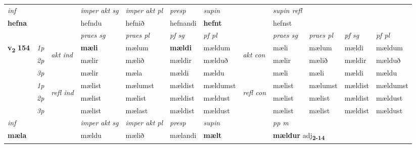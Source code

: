 \begin{longtable}[l]{X>{\footnotesize\itshape}llXXXXlXXXX}
\cmidrule{4-7}
   {\textit{inf}} & &  & \textit{imper akt sg} & \textit{imper akt pl}   & \textit{presp} & \textit{supin} && \textit{supin refl}  \\*
  {\textbf{hefna}} & && hefndu  & hefnið   & hefnandi &  \textbf{hefnt} && hefnst  \\*

\midrule

 & &   & \textit{praes sg}  & \textit{praes pl}    & \textit{ pf sg} & \textit{pf pl} & & \textit{praes sg}  & \textit{praes pl}    & \textit{pf sg} & \textit{pf pl }  \\ \cmidrule{4-7} \cmidrule{9-12}
 \multirow{2}{*}{{{\textbf{v{\textsubscript{2}}} \Large{\textbf{154}}}}}  & 1p & \multirow{3}{*}{\begin{turn}{90}\textit{akt ind}\end{turn}} & \textbf{mæli} & mælum & \textbf{mældi} & mældum & \multirow{3}{*}{\begin{turn}{90}\textit{akt con}\end{turn}} &mæli & mælum & mældi & mældum\\*
 & 2p &  &  mælir  & mælið & mældir & mælduð & & mælir & mælið & mældir & mælduð \\*
 & 3p &  & mælir & mæla & mældi & mældu & & mæli & mæli& mældi & mældu \\*
\cmidrule{4-7} \cmidrule{9-12}
 & 1p & \multirow{3}{*}{\begin{turn}{90}\textit{refl ind}\end{turn}}  & mælist & mælumst & mældist & mældumst & \multirow{3}{*}{\begin{turn}{90}\textit{refl con}\end{turn}}  &mælist & mælumst & mældist & mældumst \\*
 & 2p &  & mælist & mælist & mældist & mældust & &mælist & mælist & mældist & mældust \\*
 & 3p  & & mælist & mælast & mældist & mældust & & mælist & mælist& mældist & mældust \\*
\cmidrule{4-7} \cmidrule{9-12}

   {\textit{inf}} & &  & \textit{imper akt sg} & \textit{imper akt pl}   & \textit{presp} & \textit{supin}  && \textit{pp m} \\*
  {\textbf{mæla}} & && mældu  & mælið   & mælandi &  \textbf{mælt}  && \multicolumn{2}{l}{\textbf{mældur} adj\textbf{\textsubscript{2-14}}} \\*

\midrule


\end{longtable}
